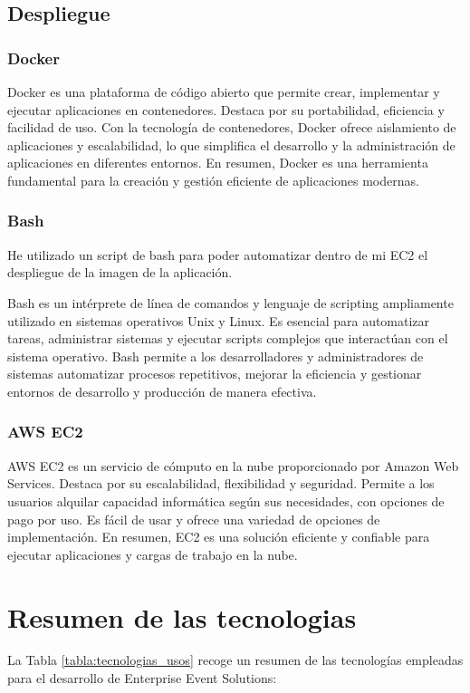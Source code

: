 \subsection{Despliegue}

\subsubsection{Docker}
Docker\cite{Docker} es una plataforma de código abierto que permite crear, implementar y ejecutar aplicaciones en contenedores. Destaca por su portabilidad,
eficiencia y facilidad de uso. Con la tecnología de contenedores, Docker ofrece aislamiento de aplicaciones y escalabilidad, lo que simplifica el
desarrollo y la administración de aplicaciones en diferentes entornos. En resumen, Docker es una herramienta fundamental para la creación y gestión
eficiente de aplicaciones modernas.

\subsubsection{Bash}

He utilizado un script de bash para poder automatizar dentro de mi EC2 el despliegue de la imagen de la aplicación.

Bash es un intérprete de línea de comandos y lenguaje de scripting ampliamente utilizado en sistemas operativos Unix y Linux. Es esencial para automatizar
tareas, administrar sistemas y ejecutar scripts complejos que interactúan con el sistema operativo. Bash permite a los desarrolladores y administradores
de sistemas automatizar procesos repetitivos, mejorar la eficiencia y gestionar entornos de desarrollo y producción de manera efectiva. 

\subsubsection{AWS EC2}
AWS EC2 es un servicio de cómputo en la nube proporcionado por Amazon Web Services. Destaca por su escalabilidad, flexibilidad y seguridad.
Permite a los usuarios alquilar capacidad informática según sus necesidades, con opciones de pago por uso. Es fácil de usar y ofrece una variedad
de opciones de implementación. En resumen, EC2 es una solución eficiente y confiable para ejecutar aplicaciones y cargas de trabajo en la nube.

\section{Resumen de las tecnologias}
La Tabla \ref{tabla:tecnologias_usos} recoge un resumen de las tecnologías empleadas para el desarrollo de Enterprise Event Solutions:


